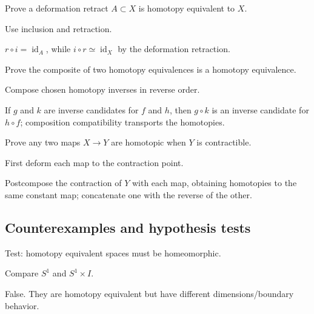 \begin{exercise}\label{exr:viii02-ped-07}
Prove a deformation retract $A\subset X$ is homotopy equivalent to $X$.
\end{exercise}
\begin{hint}
Use inclusion and retraction.
\end{hint}
\begin{solution}
$r\circ i=\operatorname{id}_A$, while $i\circ r\simeq\operatorname{id}_X$ by the deformation retraction.
\end{solution}

\begin{exercise}\label{exr:viii02-ped-08}
Prove the composite of two homotopy equivalences is a homotopy equivalence.
\end{exercise}
\begin{hint}
Compose chosen homotopy inverses in reverse order.
\end{hint}
\begin{solution}
If $g$ and $k$ are inverse candidates for $f$ and $h$, then $g\circ k$ is an inverse candidate for $h\circ f$; composition compatibility transports the homotopies.
\end{solution}

\begin{exercise}\label{exr:viii02-ped-09}
Prove any two maps $X\to Y$ are homotopic when $Y$ is contractible.
\end{exercise}
\begin{hint}
First deform each map to the contraction point.
\end{hint}
\begin{solution}
Postcompose the contraction of $Y$ with each map, obtaining homotopies to the same constant map; concatenate one with the reverse of the other.
\end{solution}

\subsection*{Counterexamples and hypothesis tests}

\begin{exercise}\label{exr:viii02-ped-10}
Test: homotopy equivalent spaces must be homeomorphic.
\end{exercise}
\begin{hint}
Compare $S^1$ and $S^1\times I$.
\end{hint}
\begin{solution}
False.  They are homotopy equivalent but have different dimensions/boundary behavior.
\end{solution}

